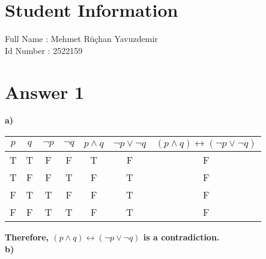 \documentclass[12pt]{article}
\begin{document}
\section*{Student Information } 

Full Name : Mehmet Rüçhan Yavuzdemir \\ 
Id Number : 2522159 \\ 

\section*{Answer 1}
\textbf{a)}
\begin{table}[H]
\centering
\begin{tabular}{|c|c|c|c|c|c|c|}                        
\hline
\textbf{$p$} & \textbf{$q$} & \textbf{$\neg p$} & \textbf{$\neg q$} & \textbf{$p \land q$} & \textbf{$\neg p \vee \neg q$} & \textbf{$(p \land q) \leftrightarrow (\neg p \vee \neg q)$} \\
\hline

T & T  & F & F & T & F & F\\ 
T & F & F & T & F & T & F\\    
F & T & T & F & F & T & F\\    
F & F & T & T & F  & T & F\\

\hline
\end{tabular}
\end{table}
\textbf{Therefore, $(p \land q) \leftrightarrow (\neg p \vee \neg q)$ is a contradiction.}\\
\noindent\textbf{b)}
\end{document}
